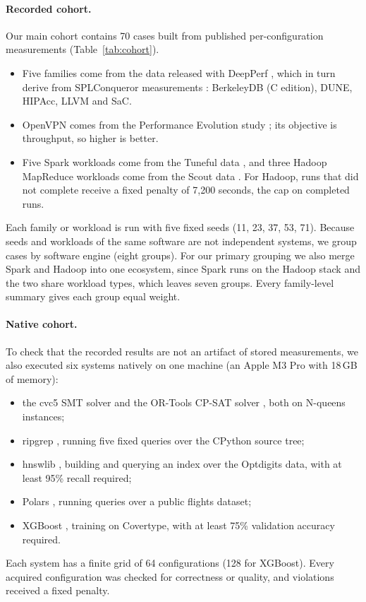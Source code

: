 \paragraph{Recorded cohort.} Our main cohort contains 70 cases built from published per-configuration measurements (Table~\ref{tab:cohort}).
\begin{itemize}
  \item Five families come from the data released with DeepPerf \cite{ha2019deepperf}, which in turn derive from SPLConqueror measurements \cite{siegmund2015influence}: BerkeleyDB (C edition), DUNE, HIPAcc, LLVM and SaC.
  \item OpenVPN comes from the Performance Evolution study \cite{kaltenecker2023evolution}; its objective is throughput, so higher is better.
  \item Five Spark workloads come from the Tuneful data \cite{fekry2020tuneful}, and three Hadoop MapReduce workloads come from the Scout data \cite{hsu2018scout}. For Hadoop, runs that did not complete receive a fixed penalty of 7,200 seconds, the cap on completed runs.
\end{itemize}
Each family or workload is run with five fixed seeds (11, 23, 37, 53, 71). Because seeds and workloads of the same software are not independent systems, we group cases by software engine (eight groups). For our primary grouping we also merge Spark and Hadoop into one ecosystem, since Spark runs on the Hadoop stack and the two share workload types, which leaves seven groups. Every family-level summary gives each group equal weight.

\paragraph{Native cohort.} To check that the recorded results are not an artifact of stored measurements, we also executed six systems natively on one machine (an Apple M3 Pro with 18\,GB of memory):
\begin{itemize}
  \item the cvc5 SMT solver \cite{barbosa2022cvc5} and the OR-Tools CP-SAT solver \cite{perron2023ortools}, both on N-queens instances;
  \item ripgrep \cite{gallant2016ripgrep}, running five fixed queries over the CPython source tree;
  \item hnswlib \cite{malkov2020hnsw}, building and querying an index over the Optdigits data, with at least 95\% recall required;
  \item Polars \cite{vink2020polars}, running queries over a public flights dataset;
  \item XGBoost \cite{chen2016xgboost}, training on Covertype, with at least 75\% validation accuracy required.
\end{itemize}
Each system has a finite grid of 64 configurations (128 for XGBoost). Every acquired configuration was checked for correctness or quality, and violations received a fixed penalty.

